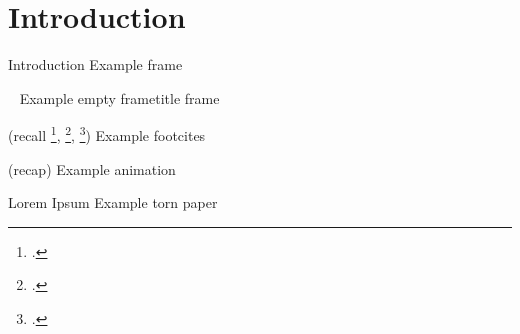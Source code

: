 \documentclass[slidecentered,compress,dvipsnames,table,xcdraw,aspectratio=169]{beamer}
\begin{document}

\section{Introduction}
\label{sec:introduction}
\begin{frame}{Introduction}
	\centering
	Example frame
\end{frame}

\begin{frame}{\ }
	\centering
	Example empty frametitle frame
\end{frame}

\begin{frame}{(recall \footcite{walmsley2020galaxy}, \footcite{gal2017deep}, \footcite{gal2016dropout})}
	\centering
	Example footcites
	\Huge
	\begin{animateinline}{30}
	\end{animateinline}
\end{frame}

\begin{frame}{(recap)}
	\centering
	Example animation
	\Huge
	\begin{animateinline}{30}
	\end{animateinline}
\end{frame}

\begin{frame}{Lorem Ipsum}
	\centering
	Example torn paper \\
\end{frame}


\end{document}
